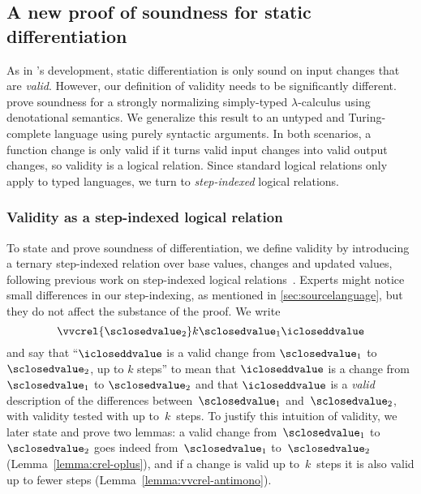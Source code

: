 \subsection{A new proof of soundness for static differentiation}
\label{sec:sound-derive}

As in \citet{CaiEtAl2014ILC}'s development, static differentiation is
only sound on input changes that are \emph{valid}. However, our
definition of validity needs to be significantly different.
%
\citeauthor{CaiEtAl2014ILC} prove soundness for a strongly normalizing
simply-typed $\lambda$-calculus using denotational semantics. We generalize this
result to an untyped and Turing-complete language using purely syntactic
arguments. In both scenarios, a function change is only valid if it turns valid
input changes into valid output changes, so validity is a logical relation.
Since standard logical relations only apply to typed languages, we turn to
\emph{step-indexed} logical relations.

\subsubsection{Validity as a step-indexed logical relation}
To state and prove soundness of differentiation, we define validity by
introducing a ternary step-indexed relation over base values, changes and
updated values, following previous work on step-indexed
logical relations~\citep{Ahmed2006stepindexed,Acar08}. Experts might notice
small differences in our step-indexing, as mentioned in
\cref{sec:sourcelanguage}, but they do not affect the substance of the proof.
%
We write
\[\vvcrel {\sclosedvalue_2} k {\sclosedvalue_1} \icloseddvalue\]
\noindent and say that ``$\icloseddvalue$ is a valid change from
$\sclosedvalue_1$ to $\sclosedvalue_2$, up to $k$ steps'' to mean that
$\icloseddvalue$ is a change from $\sclosedvalue_1$ to
$\sclosedvalue_2$ and that $\icloseddvalue$ is a \emph{valid}
description of the differences between~$\sclosedvalue_1$ 
and~$\sclosedvalue_2$, with validity tested with up to~$k$~steps.
%
To justify this intuition of validity, we later state and prove two
lemmas: a valid change from~$\sclosedvalue_1$ to~$\sclosedvalue_2$
goes indeed from~$\sclosedvalue_1$ to~$\sclosedvalue_2$
(Lemma~\ref{lemma:crel-oplus}), and if a change is valid up to~$k$~steps it
is also valid up to fewer steps (Lemma~\ref{lemma:vvcrel-antimono}).

